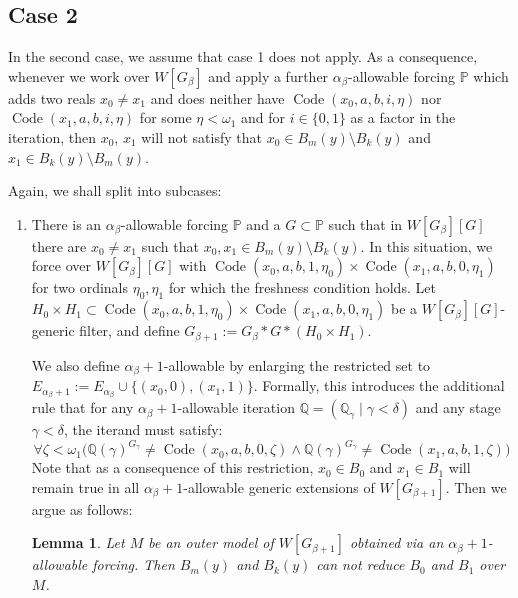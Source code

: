 \documentclass[a4paper,11pt]{article}
\newtheorem{lemma}[theorem]{Lemma}
\newcommand{\forceP}{\mathbb{P}}
\begin{document}
\subsection{Case 2}
In the second case, we assume that case 1 does not apply. As a consequence, whenever we work over $W[G_{\beta}]$ and apply a further $\alpha_{\beta}$-allowable forcing $\forceP$ which adds two reals $x_0\ne x_1$ and does neither have $\operatorname{Code} (x_0,a,b,i,\eta)$ nor $\operatorname{Code} (x_1,a,b,i,\eta)$ for some $\eta< \omega_1$ and for $i \in \{ 0,1\}$ as a factor in the iteration, then $x_0$, $x_1$ will not satisfy that $x_0 \in B_m(y) \setminus B_k(y)$ and $x_1 \in B_k(y) \setminus B_m(y)$.

Again, we shall split into subcases:



\begin{enumerate}
\item[Case 2a:] There is an $\alpha_{\beta}$-allowable forcing $\mathbb{P}$ and a $G\subset \mathbb{P}$ such that in $W[G_{\beta}] [G]$ there are $x_0\ne x_1$ such that $x_0,x_1 \in B_m (y)\setminus B_k (y) $. In this situation, we force over $W[G_{\beta}] [G]$ with $\operatorname{Code} (x_0,a,b,1,\eta_0) \times \operatorname{Code} (x_1,a,b,0,\eta_1)$ for two ordinals $\eta_0,\eta_1$ for which the freshness condition holds. Let $H_0 \times H_1 \subset \operatorname{Code} (x_0,a,b,1,\eta_0) \times \operatorname{Code} (x_1,a,b,0,\eta_1)$ be a $W[G_{\beta}][G]$-generic filter, and define $G_{\beta+1}:= G_{\beta} \ast G \ast (H_0 \times H_1)$. 

We also define $\alpha_{\beta} +1$-allowable by enlarging the restricted set to $E_{\alpha_{\beta}+1}:= E_{\alpha_{\beta}} \cup \{ (x_0,0), (x_1,1) \}$. Formally, this introduces the additional rule that for any $\alpha_{\beta}+1$-allowable iteration $\mathbb{Q} = (\mathbb{Q}_{\gamma} \mid \gamma < \delta)$ and any stage $\gamma < \delta$, the iterand must satisfy:
$$ \forall \zeta < \omega_1 \Big( \mathbb{Q}(\gamma)^{G_{\gamma}} \neq \operatorname{Code}(x_0,a,b,0,\zeta) \land \mathbb{Q}(\gamma)^{G_{\gamma}} \neq \operatorname{Code}(x_1,a,b,1,\zeta) \Big) $$
Note that as a consequence of this restriction, $x_0 \in B_0$ and $x_1 \in B_1$ will remain true in all $\alpha_{\beta} +1$-allowable generic extensions of $W[G_{\beta+1}]$.
Then we argue as follows:
\begin{lemma}
Let $M$ be an outer model of $W[G_{\beta+1}]$ obtained via
an $\alpha_{\beta}+1$-allowable forcing. Then $B_m(y)$ and $B_k(y)$ can not reduce $B_0$ and $B_1$ over $M$.
\end{lemma}


\end{enumerate}
\end{document}

